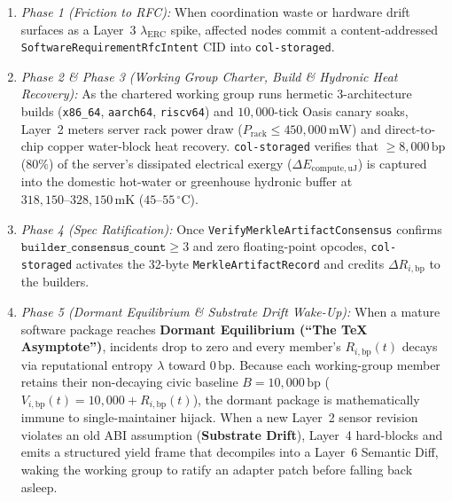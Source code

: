 \begin{enumerate}
    \item \textit{Phase 1 (Friction to RFC):} When coordination waste or hardware drift surfaces as a Layer~3 $\lambda_{\mathrm{ERC}}$ spike, affected nodes commit a content-addressed \texttt{SoftwareRequirementRfcIntent} CID into \texttt{col-storaged}.
    \item \textit{Phase 2 \& Phase 3 (Working Group Charter, Build \& Hydronic Heat Recovery):} As the chartered working group runs hermetic 3-architecture builds (\texttt{x86\_64}, \texttt{aarch64}, \texttt{riscv64}) and $10{,}000$-tick Oasis canary soaks, Layer~2 meters server rack power draw ($P_{\mathrm{rack}} \le 450{,}000\,\mathrm{mW}$) and direct-to-chip copper water-block heat recovery. \texttt{col-storaged} verifies that $\ge 8{,}000\,\mathrm{bp}$ ($80\%$) of the server's dissipated electrical exergy ($\Delta E_{\mathrm{compute},\mathrm{uJ}}$) is captured into the domestic hot-water or greenhouse hydronic buffer at $318{,}150\text{--}328{,}150\,\mathrm{mK}$ ($45\text{--}55\,^\circ\mathrm{C}$).
    \item \textit{Phase 4 (Spec Ratification):} Once \texttt{VerifyMerkleArtifactConsensus} confirms $\texttt{builder\_consensus\_count} \ge 3$ and zero floating-point opcodes, \texttt{col-storaged} activates the 32-byte \texttt{MerkleArtifactRecord} and credits $\Delta R_{i,\mathrm{bp}}$ to the builders.
    \item \textit{Phase 5 (Dormant Equilibrium \& Substrate Drift Wake-Up):} When a mature software package reaches \textbf{Dormant Equilibrium (``The TeX Asymptote'')}, incidents drop to zero and every member's $R_{i,\mathrm{bp}}(t)$ decays via reputational entropy $\lambda$ toward $0\,\mathrm{bp}$. Because each working-group member retains their non-decaying civic baseline $B = 10{,}000\,\mathrm{bp}$ ($V_{i,\mathrm{bp}}(t) = 10{,}000 + R_{i,\mathrm{bp}}(t)$), the dormant package is mathematically immune to single-maintainer hijack. When a new Layer~2 sensor revision violates an old ABI assumption (\textbf{Substrate Drift}), Layer~4 hard-blocks and emits a structured yield frame that decompiles into a Layer~6 Semantic Diff, waking the working group to ratify an adapter patch before falling back asleep.
\end{enumerate}

